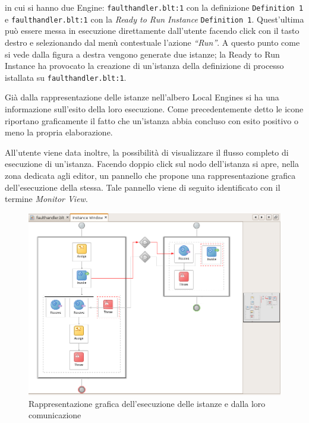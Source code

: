 in cui si hanno due Engine: \texttt{faulthandler.blt:1} con la definizione
\texttt{Definition 1} e \texttt{faulthandler.blt:1} con la \emph{Ready to Run
Instance} \texttt{Definition 1}. Quest'ultima può essere messa in esecuzione
direttamente dall'utente facendo click con il tasto destro e selezionando dal
menù contestuale l'azione \emph{``Run''}. A questo punto come si vede dalla
figura a destra vengono generate due istanze; la Ready to Run Instance ha
provocato la creazione di un'istanza della definizione di processo istallata su
\texttt{faulthandler.blt:1}.

Già dalla rappresentazione delle istanze nell'albero Local Engines si ha una
informazione sull'esito della loro esecuzione. Come precedentemente detto
le icone riportano graficamente il fatto che un'istanza abbia concluso con
esito positivo o meno la propria elaborazione. 

All'utente viene data inoltre, la possibilità di visualizzare il flusso
completo di esecuzione di un'istanza. Facendo doppio click sul nodo
dell'istanza si apre, nella zona dedicata agli editor, un pannello
che propone una rappresentazione grafica dell'esecuzione della stessa. Tale
pannello viene di seguito identificato con il termine \emph{Monitor View}.

\begin{figure}[p]
\begin{center}
\includegraphics[scale=0.65,angle=90]
{blide/dia/BlideMonitor1}
\caption[Blide: rappresentazione grafica di istanze]{Rappresentazione grafica
dell'esecuzione delle istanze e dalla loro comunicazione}
  \label{fig:blideMonitor1}
\end{center}
\end{figure}

